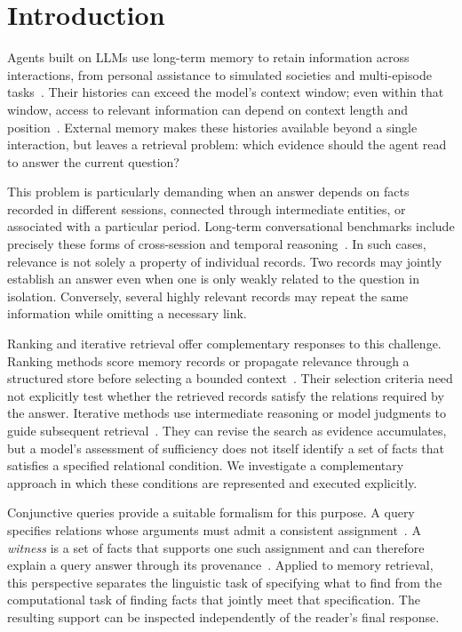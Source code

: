 \section{Introduction}
\label{sec:intro}

Agents built on \acp{LLM} use long-term memory to retain information across
interactions, from personal assistance to simulated societies and
multi-episode tasks~\cite{park2023generative,packer2023memgpt,sumers2024coala,zhang2025survey}.
Their histories can exceed the model's context window; even within that
window, access to relevant information can depend on context length and
position~\cite{liu2024lost,hsieh2024ruler}. External memory makes these
histories available beyond a single interaction, but leaves a retrieval
problem: which evidence should the agent read to answer the current
question?

This problem is particularly demanding when an answer depends on facts
recorded in different sessions, connected through intermediate entities,
or associated with a particular period. Long-term conversational
benchmarks include precisely these forms of cross-session and temporal
reasoning~\cite{maharana2024locomo,wu2025longmemeval}. In such cases,
relevance is not solely a property of individual records. Two records
may jointly establish an answer even when one is only weakly related to
the question in isolation. Conversely, several highly relevant records
may repeat the same information while omitting a necessary link.

Ranking and iterative retrieval offer complementary responses to this
challenge. Ranking methods score memory records or propagate relevance
through a structured store before selecting a bounded
context~\cite{park2023generative,zhong2024memorybank,chhikara2025mem0,gutierrez2024hipporag}.
Their selection criteria need not explicitly test whether the retrieved
records satisfy the relations required by the answer. Iterative methods
use intermediate reasoning or model judgments to guide subsequent
retrieval~\cite{trivedi2023ircot,asai2024selfrag,jeong2024adaptiverag,yan2025gam}.
They can revise the search as evidence accumulates, but a model's
assessment of sufficiency does not itself identify a set of facts that
satisfies a specified relational condition. We investigate a complementary
approach in which these conditions are represented and executed explicitly.

Conjunctive queries provide a suitable formalism for this purpose.
A query specifies relations whose arguments must admit a consistent
assignment~\cite{chandra1977conjunctive}. A \emph{witness} is a set of
facts that supports one such assignment and can therefore explain a
query answer through its provenance~\cite{buneman2001why,green2007provenance}.
Applied to memory retrieval, this perspective separates the linguistic
task of specifying what to find from the computational task of finding
facts that jointly meet that specification. The resulting support can
be inspected independently of the reader's final response.

